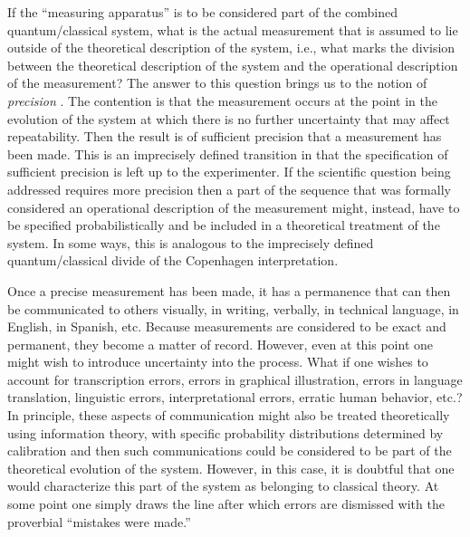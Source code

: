\documentclass [12pt]{revtex4}
\begin{document}
If the ``measuring apparatus'' is to be considered part of the
combined quantum/classical system, what is the actual
{measurement} that is assumed to lie outside of the
theoretical description of the system, i.e., what marks the division
between the theoretical description of the system and the
operational description of the measurement? The answer to this
question brings us to the notion of {\it precision}
\cite{precision}. The contention is that the measurement occurs at
the point in the evolution of the system at which there is no
further uncertainty that may affect
repeatability. Then the result is of {sufficient precision}
that a measurement has been made. This is an imprecisely defined
transition in that the specification of sufficient precision is left
up to the experimenter. If the scientific question being addressed
requires more precision then a part of the sequence that was
formally considered an operational description of the measurement
might, instead, have to be specified probabilistically and be
included in a theoretical treatment of the system. In some ways,
this is analogous to the imprecisely defined quantum/classical
divide of the Copenhagen interpretation.

Once a {precise} measurement has been made, it has a
permanence that can then be communicated to others visually, in
writing, verbally, in technical language, in English, in Spanish,
etc. Because measurements are considered to be exact and permanent,
they become a matter of record. However, even at this point one
might wish to introduce uncertainty into the process. What if one
wishes to account for transcription errors, errors in graphical
illustration, errors in language translation, linguistic errors,
interpretational errors, erratic human behavior, etc.? In principle,
these aspects of communication might also be treated theoretically
using information theory, with specific probability distributions
determined by calibration and then such communications could be
considered to be part of the theoretical evolution of the system.
However, in this case, it is doubtful that one would characterize
this part of the system as belonging to classical theory.  At some
point one simply draws the line after which errors are dismissed with
the proverbial ``mistakes were made.''
\end{document}
